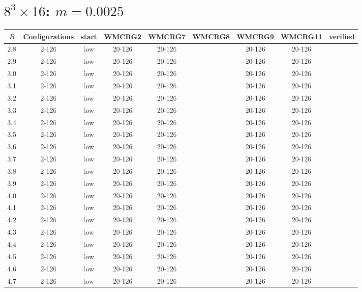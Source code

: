 \documentclass{article}
\begin{document}
  \section*{$8^3\times16$:  $m=0.0025$}
    \begin{center}
    \begin{tabular}{| c | c | c | c | c | c | c | c | c |}
      \hline
      $B$ & Configurations & start & WMCRG2 & WMCRG7 & WMCRG8 & WMCRG9 & WMCRG11 & verified\\
      \hline
      2.8 & 2-126 & low & 20-126 & 20-126 &  & 20-126 & 20-126 &\\
      2.9 & 2-126 & low & 20-126 & 20-126 &  & 20-126 & 20-126 &\\
      3.0 & 2-126 & low & 20-126 & 20-126 &  & 20-126 & 20-126 &\\
      3.1 & 2-126 & low & 20-126 & 20-126 &  & 20-126 & 20-126 &\\
      3.2 & 2-126 & low & 20-126 & 20-126 &  & 20-126 & 20-126 &\\
      3.3 & 2-126 & low & 20-126 & 20-126 &  & 20-126 & 20-126 &\\
      3.4 & 2-126 & low & 20-126 & 20-126 &  & 20-126 & 20-126 &\\
      3.5 & 2-126 & low & 20-126 & 20-126 &  & 20-126 & 20-126 &\\
      3.6 & 2-126 & low & 20-126 & 20-126 &  & 20-126 & 20-126 &\\
      3.7 & 2-126 & low & 20-126 & 20-126 &  & 20-126 & 20-126 &\\
      3.8 & 2-126 & low & 20-126 & 20-126 &  & 20-126 & 20-126 &\\
      3.9 & 2-126 & low & 20-126 & 20-126 &  & 20-126 & 20-126 &\\
      4.0 & 2-126 & low & 20-126 & 20-126 &  & 20-126 & 20-126 &\\
      4.1 & 2-126 & low & 20-126 & 20-126 &  & 20-126 & 20-126 &\\
      4.2 & 2-126 & low & 20-126 & 20-126 &  & 20-126 & 20-126 &\\
      4.3 & 2-126 & low & 20-126 & 20-126 &  & 20-126 & 20-126 &\\
      4.4 & 2-126 & low & 20-126 & 20-126 &  & 20-126 & 20-126 &\\
      4.5 & 2-126 & low & 20-126 & 20-126 &  & 20-126 & 20-126 &\\
      4.6 & 2-126 & low & 20-126 & 20-126 &  & 20-126 & 20-126 &\\
      4.7 & 2-126 & low & 20-126 & 20-126 &  & 20-126 & 20-126 &\\

\end{tabular}
\end{center}
\end{document}
